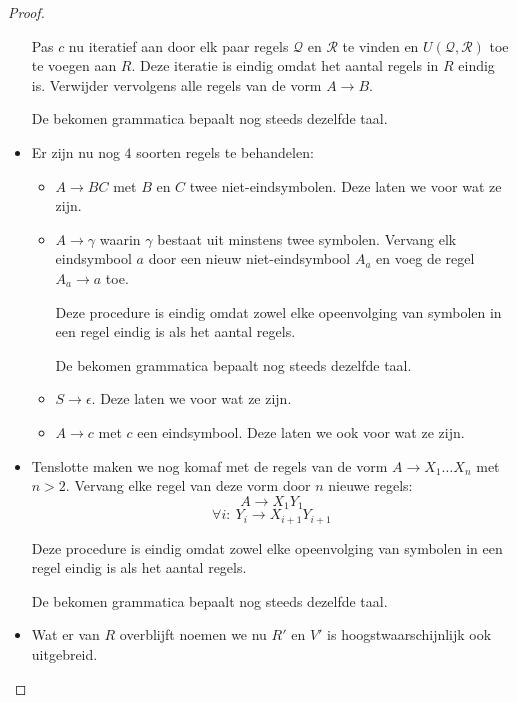 \documentclass[main.tex]{subfiles}
\begin{document}
\begin{st}
\begin{proof}
\begin{itemize}
      Pas $c$ nu iteratief aan door elk paar regels $\mathcal{Q}$ en $\mathcal{R}$ te vinden en $U(\mathcal{Q},\mathcal{R})$ toe te voegen aan $R$.
      Deze iteratie is eindig omdat het aantal regels in $R$ eindig is.
      Verwijder vervolgens alle regels van de vorm $A\rightarrow B$.

      De bekomen grammatica bepaalt nog steeds dezelfde taal.

    \item Er zijn nu nog $4$ soorten regels te behandelen:
      \begin{itemize}
      \item $A\rightarrow BC$ met $B$ en $C$ twee niet-eindsymbolen.
        Deze laten we voor wat ze zijn.
      \item $A\rightarrow \gamma$ waarin $\gamma$ bestaat uit minstens twee symbolen.
        Vervang elk eindsymbool $a$ door een nieuw niet-eindsymbool $A_{a}$ en voeg de regel $A_{a} \rightarrow a$ toe.

        Deze procedure is eindig omdat zowel elke opeenvolging van symbolen in een regel eindig is als het aantal regels.

        De bekomen grammatica bepaalt nog steeds dezelfde taal.

      \item $S\rightarrow \epsilon$.
        Deze laten we voor wat ze zijn.
      \item $A\rightarrow c$ met $c$ een eindsymbool.
        Deze laten we ook voor wat ze zijn.
      \end{itemize}
    
    \item Tenslotte maken we nog komaf met de regels van de vorm $A \rightarrow X_{1}\dotsc X_{n}$ met $n > 2$.
      Vervang elke regel van deze vorm door $n$ nieuwe regels:
      \[ A \rightarrow X_{1}Y_{1} \]
      \[ \forall i:\ Y_{i} \rightarrow X_{i+1}Y_{i+1} \]

      Deze procedure is eindig omdat zowel elke opeenvolging van symbolen in een regel eindig is als het aantal regels.

      De bekomen grammatica bepaalt nog steeds dezelfde taal.


    \item Wat er van $R$ overblijft noemen we nu $R'$ en $V'$ is hoogstwaarschijnlijk ook uitgebreid.
    \end{itemize}
  \end{proof}
\end{st}
\end{document}
